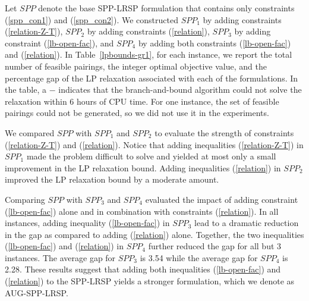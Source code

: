 \documentclass[11pt]{article}
\begin{document}
  
Let $SPP$ denote the base SPP-LRSP formulation that contains only constraints
(\ref{spp_con1}) and (\ref{spp_con2}).  We constructed $SPP_1$ by adding constraints 
(\ref{relation-Z-T}), $SPP_2$ by adding constraints (\ref{relation}), 
$SPP_3$ by adding constraint (\ref{lb-open-fac}), and $SPP_4$ by adding
both constraints (\ref{lb-open-fac}) and (\ref{relation}).  
In Table~\ref{lpbounds-gr1}, for each instance, we report the total number of feasible pairings,
the integer optimal objective value, and the percentage gap of
the LP relaxation associated with each of the formulations.
In the table, a $-$ indicates that the branch-and-bound algorithm could not solve the
relaxation within 6 hours of CPU time.  For one instance, the set of feasible pairings
could not be generated, so we did not use it in the experiments.

We compared $SPP$ with $SPP_1$ and $SPP_2$ to evaluate the strength of constraints 
(\ref{relation-Z-T}) and (\ref{relation}). Notice that adding inequalities (\ref{relation-Z-T}) 
in $SPP_1$ made the problem difficult to solve and yielded at most only a small improvement 
in the LP relaxation bound.  Adding inequalities (\ref{relation}) in $SPP_2$ improved the LP relaxation 
bound by a moderate amount. 
 
Comparing $SPP$ with $SPP_3$ and $SPP_4$ evaluated the impact of adding constraint (\ref{lb-open-fac}) 
alone and in combination with constraints (\ref{relation}).
In all instances, adding inequality (\ref{lb-open-fac}) in $SPP_3$ lead to a dramatic
reduction in the gap as compared to adding (\ref{relation}) alone.
Together, the two inequalities (\ref{lb-open-fac}) and (\ref{relation}) in $SPP_4$ further reduced the
gap for all but 3 instances.  The average gap for $SPP_3$ is 3.54 while
the average gap for $SPP_4$ is 2.28.  
These results suggest that adding both inequalities (\ref{lb-open-fac}) and (\ref{relation})
to the SPP-LRSP yields a stronger formulation, which we denote as AUG-SPP-LRSP.
\end{document}
